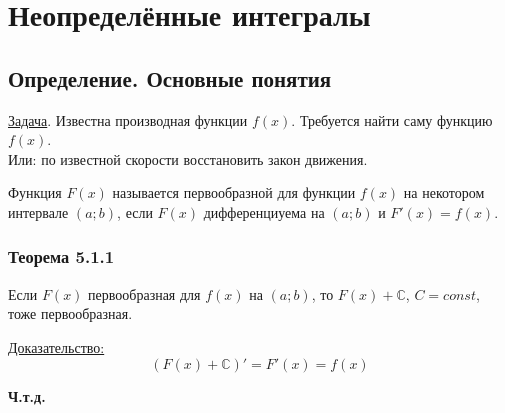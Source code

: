 \documentclass[12pt]{article}
\begin{document}

    \section{Неопределённые интегралы}
    \subsection{Определение. Основные понятия}
    \underline{Задача}. Известна производная функции $f(x)$. Требуется найти саму функцию $f(x)$.\\
    Или: по известной скорости восстановить закон движения.\par\noindent
    Функция $F(x)$ называется первообразной для функции $f(x)$ на некотором интервале $(a; b)$, если $F(x)$ дифференциуема на $(a; b)$ и $F'(x) = f(x)$.
    \subsubsection*{Теорема 5.1.1}\label{th:5.1.1}
    Если $F(x)$ первообразная для $f(x)$ на $(a; b)$, то $F(x) + \mathbb{C}$, $C = const$, тоже первообразная.\par\noindent
    \underline{Доказательство:}
    \[ (F(x) + \mathbb{C})' = F'(x) = f(x) \]
    \begin{center}
        \textbf{Ч.т.д.}
    \end{center}
\end{document}
